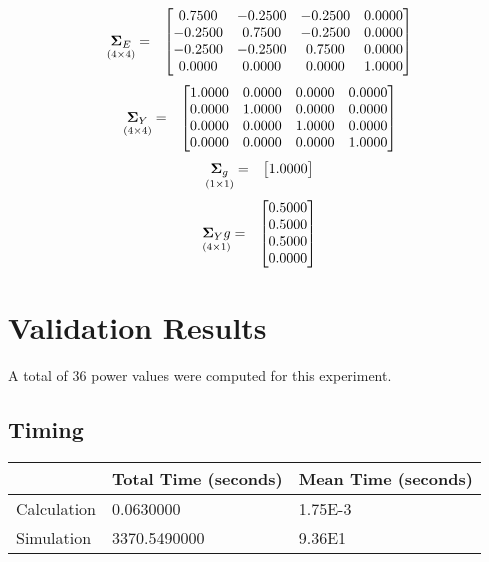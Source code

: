 \documentclass{glimmpse-report}
\begin{document}
\begin{eqnarray*}
\underset{\left(4\times4\right)}{\mathbf{\Sigma}_E} & = & \begin{bmatrix}0.7500 & -0.2500 & -0.2500 & 0.0000\protect\\
-0.2500 & 0.7500 & -0.2500 & 0.0000\protect\\
-0.2500 & -0.2500 & 0.7500 & 0.0000\protect\\
0.0000 & 0.0000 & 0.0000 & 1.0000\protect\\
\end{bmatrix}
\end{eqnarray*}
\begin{eqnarray*}
\underset{\left(4\times4\right)}{\mathbf{\Sigma}_Y} & = & \begin{bmatrix}1.0000 & 0.0000 & 0.0000 & 0.0000\protect\\
0.0000 & 1.0000 & 0.0000 & 0.0000\protect\\
0.0000 & 0.0000 & 1.0000 & 0.0000\protect\\
0.0000 & 0.0000 & 0.0000 & 1.0000\protect\\
\end{bmatrix}
\end{eqnarray*}
\begin{eqnarray*}
\underset{\left(1\times1\right)}{\mathbf{\Sigma}_g} & = & \begin{bmatrix}1.0000\protect\\
\end{bmatrix}
\end{eqnarray*}
\begin{eqnarray*}
\underset{\left(4\times1\right)}{\mathbf{\Sigma}_Yg} & = & \begin{bmatrix}0.5000\protect\\
0.5000\protect\\
0.5000\protect\\
0.0000\protect\\
\end{bmatrix}
\end{eqnarray*}
\section{Validation Results}
A total of 36 power values were computed for this experiment.

\subsection{Timing}
\begin{tabular}{|l|l|l|}
\hline
 & Total Time (seconds) & Mean Time (seconds) \\ 
\hline
Calculation & 0.0630000 & 1.75E-3\tabularnewline
\hline
Simulation & 3370.5490000 & 9.36E1\tabularnewline
\hline
\end{tabular}
\end{document}
